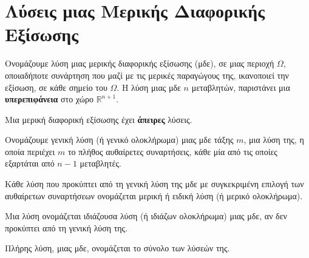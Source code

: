 \section*{Λύσεις μιας Μερικής Διαφορικής Εξίσωσης}

\begin{mybox1}
  \begin{dfn}
    Ονομάζουμε \textcolor{Col1}{λύση} μιας μερικής διαφορικής εξίσωσης (μδε), σε μιας 
    περιοχή $ \Omega $, οποιαδήποτε συνάρτηση που μαζί με τις μερικές παραγώγους της, 
    ικανοποιεί την εξίσωση, σε κάθε σημείο του $ \Omega $.
    Η λύση μιας μδε $n$ μεταβλητών, παριστάνει μια \textbf{υπερεπιφάνεια} στο χώρο 
    $ \mathbb{R}^{n+1} $.
  \end{dfn}
\end{mybox1}

\begin{rem}
  Μια μερική διαφορική εξίσωσης έχει \textbf{άπειρες} λύσεις.
\end{rem}

\begin{mybox1}
  \begin{dfn}
    Ονομάζουμε \textcolor{Col1}{γενική λύση (ή γενικό ολοκλήρωμα)} μιας μδε τάξης $m$, 
    μια λύση της, η οποία περιέχει $m$ το πλήθος αυθαίρετες συναρτήσεις, κάθε μία από 
    τις οποίες εξαρτάται από $ n-1 $ μεταβλητές.
  \end{dfn}
\end{mybox1}

\begin{mybox1}
  \begin{dfn}
    Κάθε λύση που προκύπτει από τη γενική λύση της μδε με συγκεκριμένη επιλογή των 
    αυθαίρετων συναρτήσεων ονομάζεται \textcolor{Col1}{μερική ή ειδική λύση (ή μερικό
    ολοκλήρωμα)}.
  \end{dfn}
\end{mybox1}

\begin{mybox1}
  \begin{dfn}
    Μια λύση ονομάζεται \textcolor{Col1}{ιδιάζουσα λύση (ή ιδιάζων ολοκλήρωμα)} μιας 
    μδε, αν δεν προκύπτει από τη γενική λύση της.
  \end{dfn}
\end{mybox1}

\begin{mybox1}
  \begin{dfn}
    \textcolor{Col1}{Πλήρης λύση}, μιας μδε, ονομάζεται το σύνολο των λύσεών της.
  \end{dfn}
\end{mybox1}

